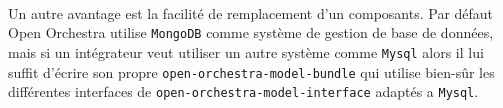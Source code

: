    \paragraph{}
   Un autre avantage est la facilité de remplacement d'un composants. Par défaut Open Orchestra utilise \verb?MongoDB? comme système de gestion de base de données, mais si un intégrateur veut utiliser un autre système comme \verb?Mysql? alors il lui suffit d'écrire son propre \newline  \verb?open-orchestra-model-bundle? qui utilise bien-sûr les différentes interfaces de  \newline  \verb?open-orchestra-model-interface? adaptés a \verb?Mysql?.